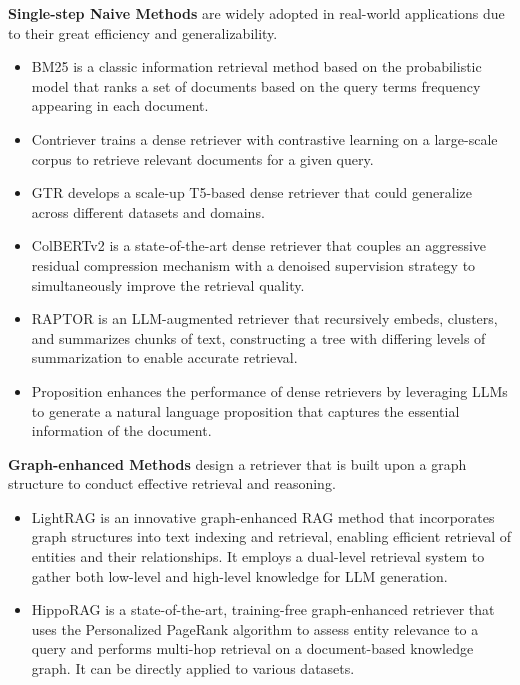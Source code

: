 \noindent\textbf{Single-step Naive Methods} are widely adopted in real-world applications due to their great efficiency and generalizability. 
\begin{itemize}
    \item BM25 \cite{robertson1994some} is a classic information retrieval method based on the probabilistic model that ranks a set of documents based on the query terms frequency appearing in each document.
    \item Contriever \cite{izacardunsupervised} trains a dense retriever with contrastive learning on a large-scale corpus to retrieve relevant documents for a given query.
    \item GTR \cite{ni2022large} develops a scale-up T5-based dense retriever that could generalize across different datasets and domains.
    \item ColBERTv2 \cite{santhanam2022colbertv2} is a state-of-the-art dense retriever that couples an aggressive residual compression mechanism with a denoised supervision strategy to simultaneously improve the retrieval quality.
    \item RAPTOR \cite{sarthiraptor} is an LLM-augmented retriever that recursively embeds, clusters, and summarizes chunks of text, constructing a tree with differing levels of summarization to enable accurate retrieval.
    \item Proposition \cite{chen-etal-2024-dense} enhances the performance of dense retrievers by leveraging LLMs to generate a natural language proposition that captures the essential information of the document.
\end{itemize}

\noindent\textbf{Graph-enhanced Methods} design a retriever that is built upon a graph structure to conduct effective retrieval and reasoning.
\begin{itemize}
    \item LightRAG \cite{guo2024lightrag} is an innovative graph-enhanced RAG method that incorporates graph structures into text indexing and retrieval, enabling efficient retrieval of entities and their relationships. It employs a dual-level retrieval system to gather both low-level and high-level knowledge for LLM generation.
    \item HippoRAG \cite{gutiérrez2024hipporag} is a state-of-the-art, training-free graph-enhanced retriever that uses the Personalized PageRank algorithm to assess entity relevance to a query and performs multi-hop retrieval on a document-based knowledge graph. It can be directly applied to various datasets.
\end{itemize}

